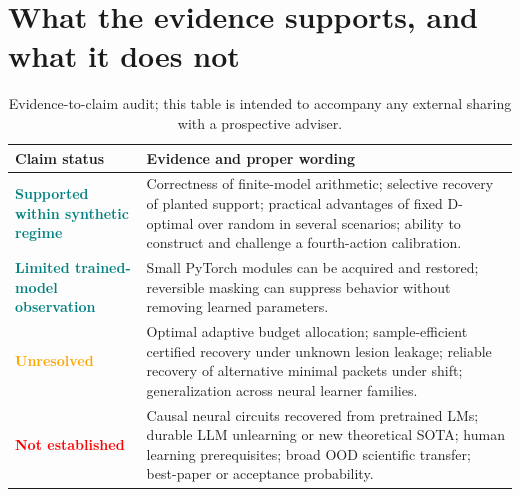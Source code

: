 \documentclass[10.5pt,a4paper]{article}
\begin{document}
\section{What the evidence supports, and what it does not}
\begin{table}[H]\centering\small
\begin{tabularx}{\linewidth}{>{\bfseries}p{.19\linewidth}Y}
\toprule
\textbf{Claim status} & \textbf{Evidence and proper wording}\\\midrule
\textcolor{teal}{Supported within synthetic regime} & Correctness of finite-model arithmetic; selective recovery of planted support; practical advantages of fixed D-optimal over random in several scenarios; ability to construct and challenge a fourth-action calibration.\\
\textcolor{teal}{Limited trained-model observation} & Small PyTorch modules can be acquired and restored; reversible masking can suppress behavior without removing learned parameters.\\
\textcolor{orange}{Unresolved} & Optimal adaptive budget allocation; sample-efficient certified recovery under unknown lesion leakage; reliable recovery of alternative minimal packets under shift; generalization across neural learner families.\\
\textcolor{red}{Not established} & Causal neural circuits recovered from pretrained LMs; durable LLM unlearning or new theoretical SOTA; human learning prerequisites; broad OOD scientific transfer; best-paper or acceptance probability.\\
\bottomrule
\end{tabularx}
\caption{Evidence-to-claim audit; this table is intended to accompany any external sharing with a prospective adviser.}\end{table}
\end{document}
